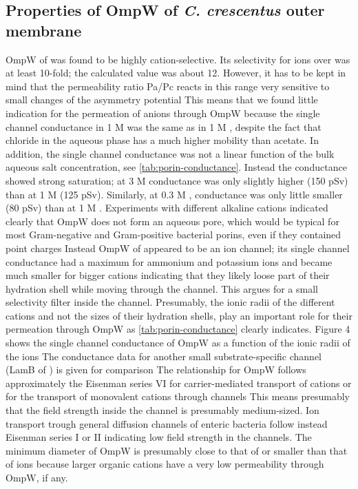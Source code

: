 \subsection{Properties of OmpW of \textit{C. crescentus} outer membrane}
OmpW of \caulobacter was found to be highly cation-selective. Its selectivity for  ions over  was at least 10-fold; the calculated value was about 12. However, it has to be kept in mind that the permeability ratio Pa/Pc reacts in this range very sensitive to small changes of the asymmetry potential This means that we found little indication for the permeation of anions through OmpW because the single channel conductance in 1 M  was the same as in 1 M , despite the fact that chloride in the aqueous phase has a much higher mobility than acetate. In addition, the single channel conductance was not a linear function of the bulk aqueous salt concentration, see \cref{tab:porin-conductance}. Instead the conductance showed strong saturation; at 3 M  conductance was only slightly higher (150 \si{\pico\sievert}) than at 1 M  (125 \si{\pico\sievert}). Similarly, at 0.3 M , conductance was only little smaller (80 \si{\pico\sievert}) than at 1 M . Experiments with different alkaline cations indicated clearly that OmpW does not form an aqueous pore, which would be typical for most Gram-negative and Gram-positive bacterial porins, even if they contained point charges Instead OmpW of \caulobacter appeared to be an ion channel; its single channel conductance had a maximum for ammonium and potassium ions and became much smaller for bigger cations indicating that they likely loose part of their hydration shell while moving through the channel. This argues for a small selectivity filter inside the channel. Presumably, the ionic radii of the different cations and not the sizes of their hydration shells, play an important role for their permeation through OmpW as \cref{tab:porin-conductance} clearly indicates. Figure 4 shows the single channel conductance of OmpW as a function of the ionic radii of the ions The conductance data for another small substrate-specific channel (LamB of \ecoli) is given for comparison The relationship for OmpW follows approximately the Eisenman series VI for carrier-mediated transport of cations or for the transport of monovalent cations through channels This means presumably that the field strength inside the channel is presumably medium-sized. Ion transport trough general diffusion channels of enteric bacteria follow instead Eisenman series I or II indicating low field strength in the channels. The minimum diameter of OmpW is presumably close to that of  or smaller than that of  ions because larger organic cations have a very low permeability through OmpW, if any. 

